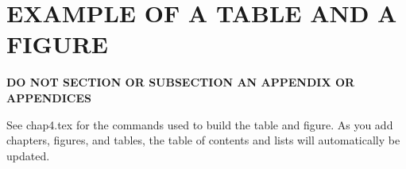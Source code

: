 \chapter{EXAMPLE OF A TABLE AND A FIGURE} \label{ap:TabAndFigChap}

{\bf DO NOT SECTION OR SUBSECTION AN APPENDIX OR APPENDICES}

See chap4.tex for the commands used to build the table and figure.  As
you add chapters, figures, and tables, the table of contents and lists
will automatically be updated.
